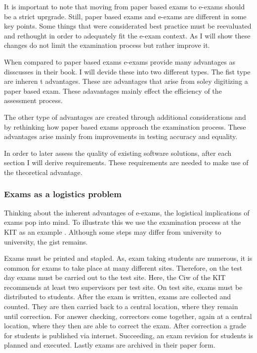 It is important to note that moving from paper based exams to e-exams
should be a strict uprgrade. Still, paper based exams and e-exams are
different in some key points. Some things that were considerated best
practice must be reevaluated and rethought in order to adequately fit
the e-exam context. As I will show these changes do not limit the
examination process but rather improve it.

When compared to paper based exams e-exams provide many advantages as
disscusses in their book. I will devide these into two different types.
The fist type are inheren t advantages. These are advantages that arise
from soley digitizing a paper based exam. These adavantages mainly
effect the efficiency of the assessment process.

The other type of advantages are created through additional
considerations and by rethinking how paper based exams approach the
examination process. These advantages arise mainly from improvements in
testing accuracy and equality.

In order to later assess the quality of existing software solutions,
after each section I will derive requirements. These requirements are
needed to make use of the theoretical advantage.

\hypertarget{exams-as-a-logistics-problem}{%
\subsubsection{Exams as a logistics
problem}\label{exams-as-a-logistics-problem}}

Thinking about the inherent advantages of e-exams, the logistical
implications of exams pop into mind. To illustrate this we use the
examination process at the KIT as an example . Although some steps may
differ from university to university, the gist remains.

Exams must be printed and stapled. As, exam taking students are
numerous, it is common for exams to take place at many different sites.
Therefore, on the test day exams must be carried out to the test site.
Here, the Ciw of the KIT recommends at least two supervisors per test
site. On test site, exams must be distributed to students. After the
exam is written, exams are collected and counted. They are then carried
back to a central location, where they remain until correction. For
answer checking, correctors come together, again at a central location,
where they then are able to correct the exam. After correction a grade
for students is published via internet. Succeeding, an exam revision for
students is planned and executed. Lastly exams are archived in their
paper form.


